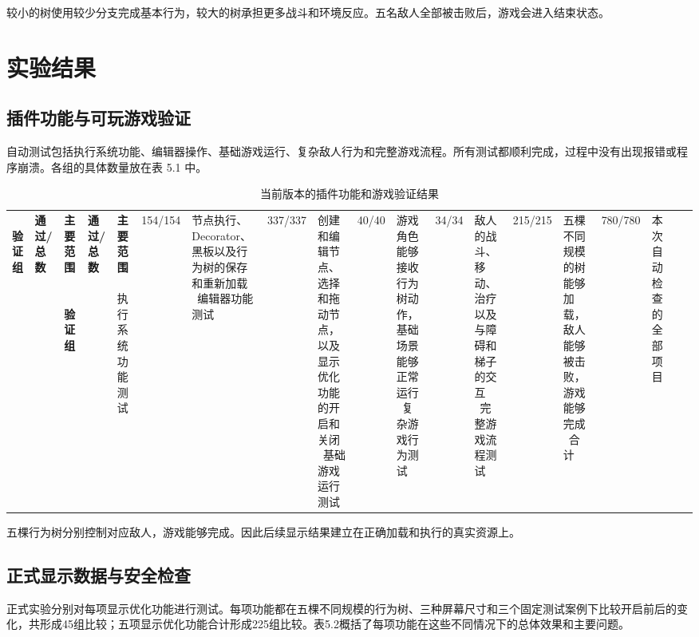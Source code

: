 \documentclass[11pt,a4paper,oneside,extrafontsizes]{memoir}
\begin{document}
较小的树使用较少分支完成基本行为，较大的树承担更多战斗和环境反应。五名敌人全部被击败后，游戏会进入结束状态。

\chapter{实验结果}

\section{插件功能与可玩游戏验证}

自动测试包括执行系统功能、编辑器操作、基础游戏运行、复杂敌人行为和完整游戏流程。所有测试都顺利完成，过程中没有出现报错或程序崩溃。各组的具体数量放在表 5.1 中。


\begin{center}

\begin{longtable}{@{}p{} p{} p{}@{}}
\caption{当前版本的插件功能和游戏验证结果}\label{tab:function-game-validation}\
\toprule
\textbf{验证组} & \textbf{通过/总数} & \textbf{主要范围} \
\midrule
\endfirsthead
\multicolumn{3}{l}{\itshape 续表}\
\toprule
\textbf{验证组} & \textbf{通过/总数} & \textbf{主要范围} \
\midrule
\endhead
执行系统功能测试 & 154/154 & 节点执行、Decorator、黑板以及行为树的保存和重新加载 \
编辑器功能测试 & 337/337 & 创建和编辑节点、选择和拖动节点，以及显示优化功能的开启和关闭 \
基础游戏运行测试 & 40/40 & 游戏角色能够接收行为树动作，基础场景能够正常运行 \
复杂游戏行为测试 & 34/34 & 敌人的战斗、移动、治疗以及与障碍和梯子的交互 \
完整游戏流程测试 & 215/215 & 五棵不同规模的树能够加载，敌人能够被击败，游戏能够完成 \
合计 & 780/780 & 本次自动检查的全部项目 \
\bottomrule
\end{longtable}
\end{center}

五棵行为树分别控制对应敌人，游戏能够完成。因此后续显示结果建立在正确加载和执行的真实资源上。

\section{正式显示数据与安全检查}

正式实验分别对每项显示优化功能进行测试。每项功能都在五棵不同规模的行为树、三种屏幕尺寸和三个固定测试案例下比较开启前后的变化，共形成45组比较；五项显示优化功能合计形成225组比较。表5.2概括了每项功能在这些不同情况下的总体效果和主要问题。
\end{document}
